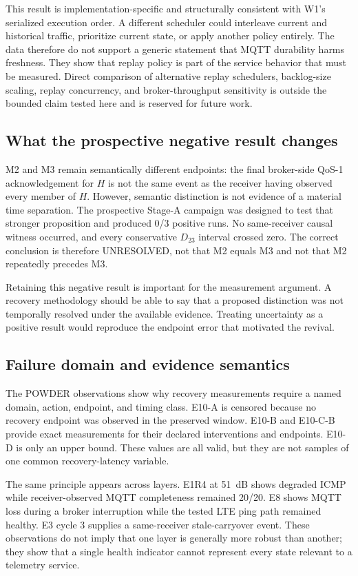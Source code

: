 \documentclass[journal]{IEEEtran}
\begin{document}
This result is implementation-specific and structurally consistent with W1's serialized execution order. A different scheduler could interleave current and historical traffic, prioritize current state, or apply another policy entirely. The data therefore do not support a generic statement that MQTT durability harms freshness. They show that replay policy is part of the service behavior that must be measured. Direct comparison of alternative replay schedulers, backlog-size scaling, replay concurrency, and broker-throughput sensitivity is outside the bounded claim tested here and is reserved for future work.

\subsection{What the prospective negative result changes}

M2 and M3 remain semantically different endpoints: the final broker-side QoS-1 acknowledgement for $H$ is not the same event as the receiver having observed every member of $H$. However, semantic distinction is not evidence of a material time separation. The prospective Stage-A campaign was designed to test that stronger proposition and produced 0/3 positive runs. No same-receiver causal witness occurred, and every conservative $D_{23}$ interval crossed zero. The correct conclusion is therefore UNRESOLVED, not that M2 equals M3 and not that M2 repeatedly precedes M3.

Retaining this negative result is important for the measurement argument. A recovery methodology should be able to say that a proposed distinction was not temporally resolved under the available evidence. Treating uncertainty as a positive result would reproduce the endpoint error that motivated the revival.

\subsection{Failure domain and evidence semantics}

The POWDER observations show why recovery measurements require a named domain, action, endpoint, and timing class. E10-A is censored because no recovery endpoint was observed in the preserved window. E10-B and E10-C-B provide exact measurements for their declared interventions and endpoints. E10-D is only an upper bound. These values are all valid, but they are not samples of one common recovery-latency variable.

The same principle appears across layers. E1R4 at 51~dB shows degraded ICMP while receiver-observed MQTT completeness remained 20/20. E8 shows MQTT loss during a broker interruption while the tested LTE ping path remained healthy. E3 cycle 3 supplies a same-receiver stale-carryover event. These observations do not imply that one layer is generally more robust than another; they show that a single health indicator cannot represent every state relevant to a telemetry service.
\end{document}
